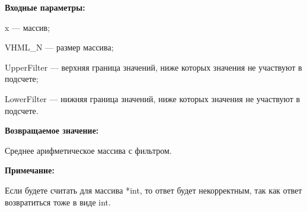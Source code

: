 \textbf{Входные параметры:}

 x --- массив;
 
 VHML\_N --- размер массива;
 
 UpperFilter --- верхняя граница значений, ниже которых значения не участвуют в подсчете;
 
 LowerFilter --- нижняя граница значений, ниже которых значения не участвуют в подсчете.

\textbf{Возвращаемое значение:}

 Среднее арифметическое массива с фильтром.
 
\textbf{Примечание:}

Если будете считать для массива *int, то ответ будет некорректным, так как ответ возвратиться тоже в виде int.
 
